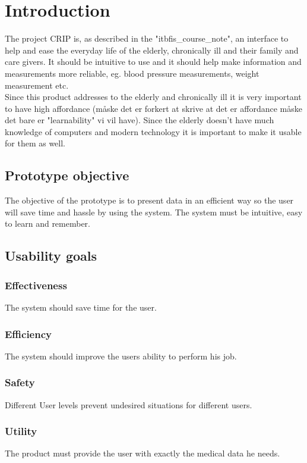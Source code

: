 \chapter{Introduction}
The project CRIP is, as described in the "itbfis\_course\_note", an interface to help and ease the everyday life of the elderly, chronically ill and their family and care givers. It should be intuitive to use and it should help make information and measurements more reliable, eg. blood pressure measurements, weight measurement  etc. \\
Since this product addresses to the elderly and chronically ill it is very important to have high affordance (måske det er forkert at skrive at det er affordance måske det bare er "learnability" vi vil have). Since the elderly doesn't have much knowledge of computers and modern technology it is important to make it usable for them as well.\\

\section{Prototype objective}
The objective of the prototype is to present data in an efficient way so the user will save time and hassle by using the system. The system must be intuitive, easy to learn and remember. 

\section{Usability goals}
\subsection{Effectiveness}
The system should save time for the user.

\subsection{Efficiency}
The system should improve the users ability to perform his job.

\subsection{Safety}
Different User levels prevent undesired situations for different users. 

\subsection{Utility}
The product must provide the user with exactly the medical data he needs.

